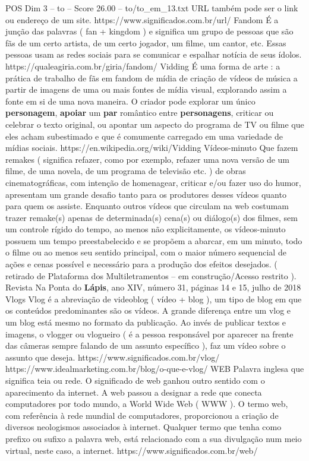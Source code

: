 \begin{textsample}{POS Dim 3 – to – Score 26.00 – to/to\_em\_13.txt}
URL também pode ser o link ou endereço de um site. https://www.significados.com.br/url/ Fandom É a junção das palavras ( fan + kingdom ) e significa um grupo de pessoas que são fãs de um certo artista, de um certo jogador, um filme, um cantor, etc.
Essas pessoas usam as redes sociais para se comunicar e espalhar notícia de seus ídolos. https://qualeagiria.com.br/giria/fandom/ Vidding É uma forma de arte : a prática de trabalho de fãs em fandom de mídia de criação de vídeos de música a partir de imagens de uma ou mais fontes de mídia visual, explorando assim a fonte em si de uma nova maneira.
O criador pode explorar um único \textbf{personagem}, \textbf{apoiar} um \textbf{par} romântico entre \textbf{personagens}, criticar ou celebrar o texto original, ou apontar um aspecto do programa de TV ou filme que eles acham subestimado e que é comumente carregado em uma variedade de mídias sociais. https://en.wikipedia.org/wiki/Vidding Vídeos-minuto Que fazem remakes ( significa refazer, como por exemplo, refazer uma nova versão de um filme, de uma novela, de um programa de televisão etc. ) de obras cinematográficas, com intenção de homenagear, criticar e/ou fazer uso do humor, apresentam um grande desafio tanto para os produtores desses vídeos quanto para quem os assiste.
Enquanto outros vídeos que circulam na web costumam trazer remake(s) apenas de determinada(s) cena(s) ou diálogo(s) dos filmes, sem um controle rígido do tempo, ao menos não explicitamente, os vídeos-minuto possuem um tempo preestabelecido e se propõem a abarcar, em um minuto, todo o filme ou ao menos seu sentido principal, com o maior número sequencial de ações e cenas possível e necessário para a produção dos efeitos desejados. ( retirado de Plataforma dos Multiletramentos – em construção/Acesso restrito ).
Revista Na Ponta do \textbf{Lápis}, ano XIV, número 31, páginas 14 e 15, julho de 2018 Vlogs Vlog é a abreviação de videoblog ( vídeo + blog ), um tipo de blog em que os conteúdos predominantes são os vídeos.
A grande diferença entre um vlog e um blog está mesmo no formato da publicação.
Ao invés de publicar textos e imagens, o vlogger ou vlogueiro ( é a pessoa responsável por aparecer na frente das câmeras sempre falando de um assunto específico ), faz um vídeo sobre o assunto que deseja. https://www.significados.com.br/vlog/ https://www.idealmarketing.com.br/blog/o-que-e-vlog/ WEB Palavra inglesa que significa teia ou rede.
O significado de web ganhou outro sentido com o aparecimento da internet.
A web passou a designar a rede que conecta computadores por todo mundo, a World Wide Web ( WWW ).
O termo web, com referência à rede mundial de computadores, proporcionou a criação de diversos neologismos associados à internet.
Qualquer termo que tenha como prefixo ou sufixo a palavra web, está relacionado com a sua divulgação num meio virtual, neste caso, a internet. https://www.significados.com.br/web/

\end{textsample}
